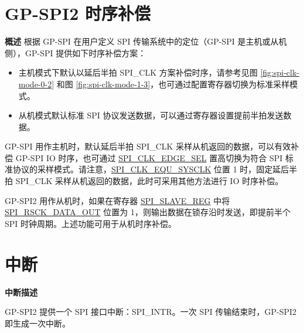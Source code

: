 \documentclass[main\_\_CN.tex]{subfiles}
\begin{document}
\section{GP-SPI2 时序补偿} \label{sec:gp-spi-timing-compensation}

\textbf{概述}
根据 GP-SPI 在用户定义 SPI 传输系统中的定位（GP-SPI 是主机或从机侧），GP-SPI 提供如下时序补偿方案：
\begin{itemize}
    \item 主机模式下默认以延后半拍 SPI\_CLK 方案补偿时序，请参考见图 \ref{fig:spi-clk-mode-0-2} 和图  \ref{fig:spi-clk-mode-1-3}，也可通过配置寄存器切换为标准采样模式。
    \item 从机模式默认标准 SPI 协议发送数据，可以通过寄存器设置提前半拍发送数据。
\end{itemize}

GP-SPI 用作主机时，默认延后半拍 SPI\_CLK 采样从机返回的数据，可以有效补偿 GP-SPI IO 时序，也可通过 \hyperref[fielddesc:SPICLKEDGESEL]{SPI\_CLK\_EDGE\_SEL} 置高切换为符合 SPI 标准协议的采样模式。请注意，\hyperref[fielddesc:SPICLKEQUSYSCLK]{SPI\_CLK\_EQU\_SYSCLK} 位置 1 时，固定延后半拍 SPI\_CLK 采样从机返回的数据，此时可采用其他方法进行 IO 时序补偿。

GP-SPI2 用作从机时，如果在寄存器 \hyperref[regdesc:SPISLAVEREG]{SPI\_SLAVE\_REG} 中将 \hyperref[fielddesc:SPIRSCKDATAOUT]{SPI\_RSCK\_DATA\_OUT} 位置为 1，则输出数据在锁存沿时发送，即提前半个 SPI 时钟周期。上述功能可用于从机时序补偿。

\section{中断} \label{sec:spi-interrupt}

\textbf{中断描述}

GP-SPI2 提供一个 SPI 接口中断：SPI\_INTR。一次 SPI 传输结束时，GP-SPI2 即生成一次中断。
\end{document}
